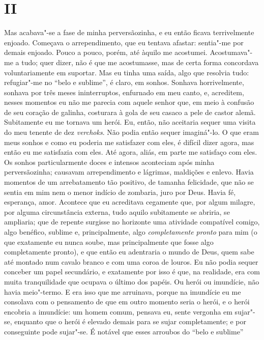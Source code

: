 \section{II}

Mas acabava"-se a fase de minha perversãozinha, e eu então ficava
terrivelmente enjoado. Começava o arrependimento, que eu tentava
afastar: sentia"-me por demais enjoado. Pouco a pouco, porém, até àquilo
me acostumei. Acostumava"-me a tudo; quer dizer, não é que me
acostumasse, mas de certa forma concordava voluntariamente em suportar.
Mas eu tinha uma saída, algo que resolvia tudo: refugiar"-me no “belo e
sublime”, é claro, em sonhos. Sonhava horrivelmente, sonhava por
três meses ininterruptos, enfurnado em meu canto, e, acreditem, nesses
momentos eu não me parecia com aquele senhor que, em meio à confusão de
seu coração de galinha, costurara à gola de seu casaco a pele de castor
alemã. Subitamente eu me tornava um herói. Eu, então, não aceitaria
sequer uma visita do meu tenente de dez \textit{verchoks}. Não podia
então sequer imaginá"-lo. O que eram meus sonhos e como eu poderia me
satisfazer com eles, é difícil dizer agora, mas então eu me satisfazia
com eles. Até agora, aliás, em parte me satisfaço com eles. Os sonhos
particularmente doces e intensos aconteciam após minha perversãozinha;
causavam arrependimento e lágrimas, maldições e enlevo. Havia momentos
de um arrebatamento tão positivo, de tamanha felicidade, que não se
sentia em mim nem o menor indício de zombaria, juro por Deus. Havia fé,
esperança, amor. Acontece que eu acreditava cegamente que, por algum
milagre, por alguma circunstância externa, tudo aquilo subitamente se
abriria, se ampliaria; que de repente surgisse no horizonte uma
atividade compatível comigo, algo benéfico, sublime e, principalmente,
algo \textit{completamente pronto} para mim (o que
exatamente eu nunca soube, mas principalmente que fosse algo
completamente pronto), e que então eu adentraria o mundo de Deus, quem
sabe até montado num cavalo branco e com uma coroa de louros. Eu não
podia sequer conceber um papel secundário, e exatamente por isso é que,
na realidade, era com muita tranquilidade que ocupava o último dos
papéis. Ou herói ou imundície, não havia meio"-termo. E era isso que me
arruinava, porque na imundície eu me consolava com o pensamento de que
em outro momento seria o herói, e o herói encobria a imundície: um
homem comum, pensava eu, sente vergonha em sujar"-se, enquanto que o
herói é elevado demais para se sujar completamente; e por conseguinte
pode sujar"-se. É notável que esses arroubos do “belo e sublime”
